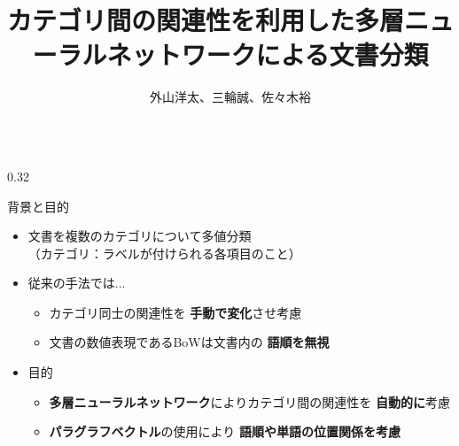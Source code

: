 \documentclass[8pt,unicode]{beamer}
\title{カテゴリ間の関連性を利用した多層ニューラルネットワークによる文書分類}
\author{外山洋太、三輪誠、佐々木裕}
\institute{豊田工業大学 工学部 先端工学基礎学科}
\date{}
\newcommand{\columnscale}{0.32}
\newcommand{\good}[1]{\textbf{\color{orange} #1}}
\newcommand{\bad}[1]{\textbf{\color{blue} #1}}
\newcommand{\keyword}[1]{\textbf{\color{red} #1}}
\begin{document}
\begin{frame}{}
\maketitle
\begin{columns}[t]

\begin{column}{\columnscale\textwidth} %
  \begin{block}{背景と目的}
    \begin{itemize}
      \item 文書を複数のカテゴリについて多値分類 \\
        （カテゴリ：ラベルが付けられる各項目のこと）
      \item 従来の手法では...
        \begin{itemize}
          \item カテゴリ同士の関連性を\bad{手動で変化}させ考慮 \\
          \item 文書の数値表現であるBoWは文書内の\bad{語順を無視} \\
        \end{itemize}
      \item 目的 \\
        \begin{itemize}
          \item \keyword{多層ニューラルネットワーク}によりカテゴリ間の関連性を
            \good{自動的に}考慮 \\
          \item \keyword{パラグラフベクトル}の使用により
            \good{語順や単語の位置関係を考慮}
        \end{itemize}
    \end{itemize}
  \end{block}


\end{column}
\end{columns}
\end{frame}
\end{document}
